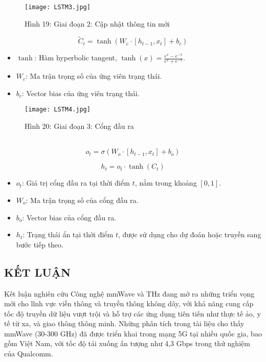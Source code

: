 \documentclass[a4paper,13pt]{article} %
\begin{document}
\clearpage
\begin{figure}[htbp]
    \centering
    \texttt{[image: LSTM3.jpg]}
    \caption*{Hình 19: Giai đoạn 2: Cập nhật thông tin mới \cite{key10} }
    \label{fig:model}
\end{figure}


\begin{equation}
\tilde{C}_t = \tanh(W_c \cdot [h_{t-1}, x_t] + b_c)  \tag{14}\label{eq:candidate_cell_state}
\end{equation}

\begin{itemize}
    \item \( \tanh \): Hàm hyperbolic tangent, \( \tanh(x) = \frac{e^x - e^{-x}}{e^x + e^{-x}} \).
    \item \( W_c \): Ma trận trọng số của ứng viên trạng thái.
    \item \( b_c \): Vector bias của ứng viên trạng thái.
\end{itemize}

\begin{figure}[htbp]
    \centering
    \texttt{[image: LSTM4.jpg]}
    \caption*{Hình 20: Giai đoạn 3: Cổng đầu ra\cite{key10} }
    \label{fig:model}
\end{figure}\\

\begin{equation}
o_t = \sigma(W_o \cdot [h_{t-1}, x_t] + b_o) \tag{15}\label{eq:output_gate}
\end{equation}

\begin{equation}
h_t = o_t \cdot \tanh(C_t) \tag{16}\label{eq:hidden_state}
\end{equation}
\begin{itemize}
    \item \( o_t \): Giá trị cổng đầu ra tại thời điểm \( t \), nằm trong khoảng \([0, 1]\).
    \item \( W_o \): Ma trận trọng số của cổng đầu ra.
    \item \( b_o \): Vector bias của cổng đầu ra.
    \item \( h_t \): Trạng thái ẩn tại thời điểm \( t \), được sử dụng cho dự đoán hoặc truyền sang bước tiếp theo.
\end{itemize}
\begin{center}
    \section{KẾT LUẬN}
\end{center}
Kết luận nghiên cứu
Công nghệ mmWave và THz đang mở ra những triển vọng mới cho lĩnh vực viễn thông và truyền thông không dây, với khả năng cung cấp tốc độ truyền dữ liệu vượt trội và hỗ trợ các ứng dụng tiên tiến như thực tế ảo, y tế từ xa, và giao thông thông minh. Những phân tích trong tài liệu cho thấy mmWave (30-300 GHz) đã được triển khai trong mạng 5G tại nhiều quốc gia, bao gồm Việt Nam, với tốc độ tải xuống ấn tượng như 4,3 Gbps trong thử nghiệm của Qualcomm. \\
\end{document}
